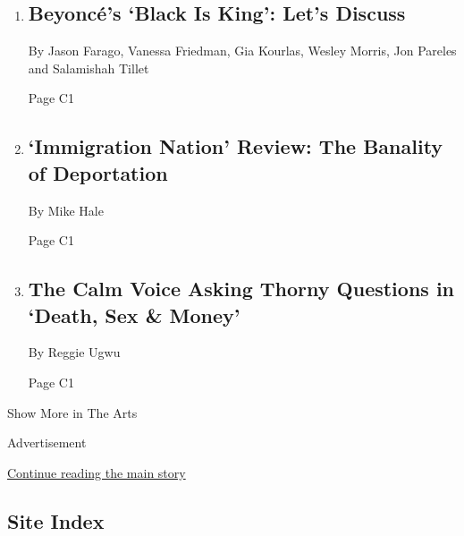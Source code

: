 \begin{enumerate}
\def\labelenumi{\arabic{enumi}.}
\item
  \href{/2020/07/31/arts/music/beyonce-black-is-king.html}{}

  \hypertarget{beyoncuxe9s-black-is-king-lets-discuss-1}{%
  \subsection{Beyoncé's `Black Is King': Let's
  Discuss}\label{beyoncuxe9s-black-is-king-lets-discuss-1}}

  By Jason Farago, Vanessa Friedman, Gia Kourlas, Wesley Morris, Jon
  Pareles and Salamishah Tillet

  Page C1
\item
  \href{/2020/08/02/arts/television/immigration-nation-review-netflix.html}{}

  \hypertarget{immigration-nation-review-the-banality-of-deportation}{%
  \subsection{`Immigration Nation' Review: The Banality of
  Deportation}\label{immigration-nation-review-the-banality-of-deportation}}

  By Mike Hale

  Page C1
\item
  \href{/2020/08/02/arts/anna-sale-death-sex-money-podcast.html}{}

  \hypertarget{the-calm-voice-asking-thorny-questions-in-death-sex--money}{%
  \subsection{The Calm Voice Asking Thorny Questions in `Death, Sex \&
  Money'}\label{the-calm-voice-asking-thorny-questions-in-death-sex--money}}

  By Reggie Ugwu

  Page C1
\end{enumerate}

Show More in The Arts

Advertisement

\protect\hyperlink{after-mid5}{Continue reading the main story}

\hypertarget{site-index}{%
\subsection{Site Index}\label{site-index}}

